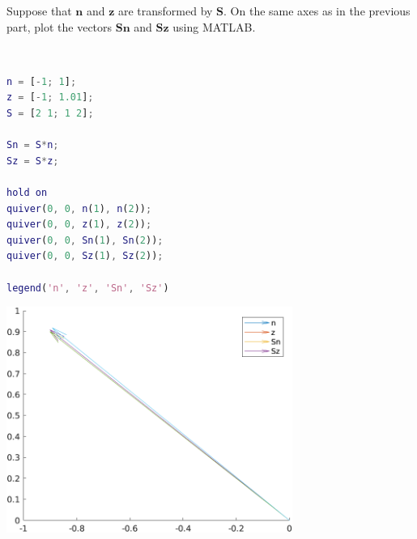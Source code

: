 Suppose that $\boldsymbol{n}$ and $\boldsymbol{z}$ are transformed by $\boldsymbol{S}$. On the same axes as in the previous part, plot the vectors $\boldsymbol{Sn}$ and $\boldsymbol{Sz}$ using MATLAB.

\begin{solution} \
    \begin{lstlisting}[language=Matlab]
n = [-1; 1];
z = [-1; 1.01];
S = [2 1; 1 2];

Sn = S*n;
Sz = S*z;

hold on
quiver(0, 0, n(1), n(2));
quiver(0, 0, z(1), z(2));
quiver(0, 0, Sn(1), Sn(2));
quiver(0, 0, Sz(1), Sz(2));

legend('n', 'z', 'Sn', 'Sz')
    \end{lstlisting}
    \begin{center}
        \includegraphics[width=0.7\textwidth]{img/e8p2.png}
    \end{center}
\end{solution}
